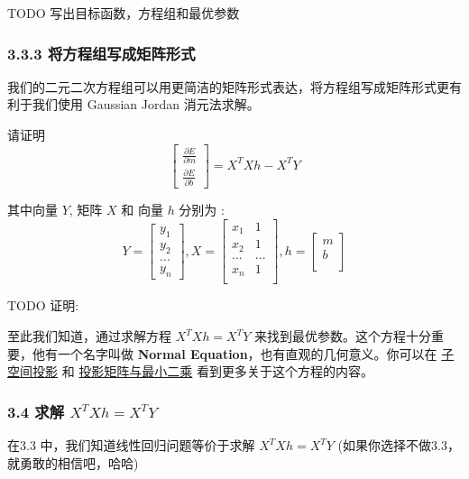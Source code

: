 \documentclass[11pt]{article}
\begin{document}
    TODO 写出目标函数，方程组和最优参数

    \subsubsection{3.3.3
将方程组写成矩阵形式}\label{ux5c06ux65b9ux7a0bux7ec4ux5199ux6210ux77e9ux9635ux5f62ux5f0f}

我们的二元二次方程组可以用更简洁的矩阵形式表达，将方程组写成矩阵形式更有利于我们使用
Gaussian Jordan 消元法求解。

请证明 \[
\begin{bmatrix}
    \frac{\partial E}{\partial m} \\
    \frac{\partial E}{\partial b} 
\end{bmatrix} = X^TXh - X^TY
\]

其中向量 \(Y\), 矩阵 \(X\) 和 向量 \(h\) 分别为 : \[
Y =  \begin{bmatrix}
    y_1 \\
    y_2 \\
    ... \\
    y_n
\end{bmatrix}
,
X =  \begin{bmatrix}
    x_1 & 1 \\
    x_2 & 1\\
    ... & ...\\
    x_n & 1 \\
\end{bmatrix},
h =  \begin{bmatrix}
    m \\
    b \\
\end{bmatrix}
\]

    TODO 证明:

    至此我们知道，通过求解方程 \(X^TXh = X^TY\)
来找到最优参数。这个方程十分重要，他有一个名字叫做 \textbf{Normal
Equation}，也有直观的几何意义。你可以在
\href{http://open.163.com/movie/2010/11/J/U/M6V0BQC4M_M6V2AJLJU.html}{子空间投影}
和
\href{http://open.163.com/movie/2010/11/P/U/M6V0BQC4M_M6V2AOJPU.html}{投影矩阵与最小二乘}
看到更多关于这个方程的内容。

    \subsubsection{\texorpdfstring{3.4 求解
\(X^TXh = X^TY\)}{3.4 求解 X\^{}TXh = X\^{}TY}}\label{ux6c42ux89e3-xtxh-xty}

在3.3 中，我们知道线性回归问题等价于求解 \(X^TXh = X^TY\)
(如果你选择不做3.3，就勇敢的相信吧，哈哈)
\end{document}
